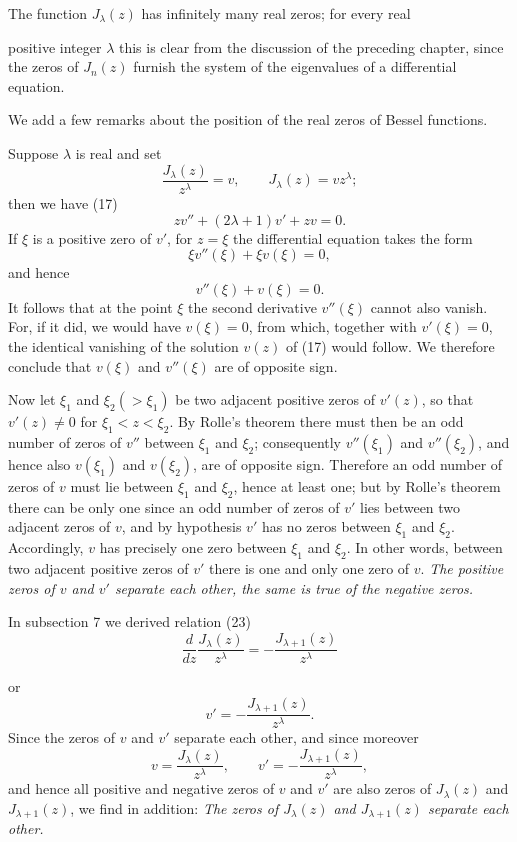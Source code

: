 The function $J_\lambda(z)$ has infinitely many real zeros; for every real

positive integer $\lambda$ this is clear from the discussion of the preceding chapter, since the zeros of $J_n(z)$ furnish the system of the eigenvalues of a differential equation.

We add a few remarks about the position of the real zeros of Bessel functions.

Suppose $\lambda$ is real and set
\[
\frac{J_\lambda(z)}{z^\lambda}=v,\qquad J_\lambda(z)=vz^\lambda;
\]
then we have (17)
\[
zv''+(2\lambda+1)v'+zv=0.
\]
If $\xi$ is a positive zero of $v'$, for $z=\xi$ the differential equation takes the form
\[
\xi v''(\xi)+\xi v(\xi)=0,
\]
and hence
\[
v''(\xi)+v(\xi)=0.
\]
It follows that at the point $\xi$ the second derivative $v''(\xi)$ cannot also vanish. For, if it did, we would have $v(\xi)=0$, from which, together with $v'(\xi)=0$, the identical vanishing of the solution $v(z)$ of (17) would follow. We therefore conclude that $v(\xi)$ and $v''(\xi)$ are of opposite sign.

Now let $\xi_1$ and $\xi_2(>\xi_1)$ be two adjacent positive zeros of $v'(z)$, so that $v'(z)\ne0$ for $\xi_1<z<\xi_2$. By Rolle's theorem there must then be an odd number of zeros of $v''$ between $\xi_1$ and $\xi_2$; consequently $v''(\xi_1)$ and $v''(\xi_2)$, and hence also $v(\xi_1)$ and $v(\xi_2)$, are of opposite sign. Therefore an odd number of zeros of $v$ must lie between $\xi_1$ and $\xi_2$, hence at least one; but by Rolle's theorem there can be only one since an odd number of zeros of $v'$ lies between two adjacent zeros of $v$, and by hypothesis $v'$ has no zeros between $\xi_1$ and $\xi_2$. Accordingly, $v$ has precisely one zero between $\xi_1$ and $\xi_2$. In other words, between two adjacent positive zeros of $v'$ there is one and only one zero of $v$. \emph{The positive zeros of $v$ and $v'$ separate each other, the same is true of the negative zeros.}

In subsection 7 we derived relation (23)
\[
\frac{d}{dz}\frac{J_\lambda(z)}{z^\lambda}=-\frac{J_{\lambda+1}(z)}{z^\lambda}
\]

or
\[
v'=-\frac{J_{\lambda+1}(z)}{z^\lambda}.
\]
Since the zeros of $v$ and $v'$ separate each other, and since moreover
\[
v=\frac{J_\lambda(z)}{z^\lambda},\qquad v'=-\frac{J_{\lambda+1}(z)}{z^\lambda},
\]
and hence all positive and negative zeros of $v$ and $v'$ are also zeros of $J_\lambda(z)$ and $J_{\lambda+1}(z)$, we find in addition: \emph{The zeros of $J_\lambda(z)$ and $J_{\lambda+1}(z)$ separate each other.}

